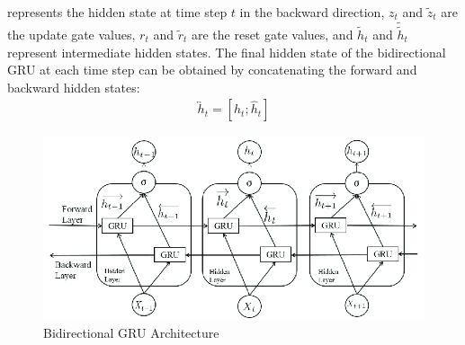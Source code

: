 \documentclass[a4paper, noexaminfo]{sapthesis}
\begin{document}
represents the hidden state at time step $t$ in the backward direction, 
$z_t$ and $\tilde{z}_t$ are the update gate values, $r_t$ and 
$\tilde{r}_t$ are the reset gate values, and $\tilde{h}_t$ 
and $\tilde{\tilde{h}}_t$ represent intermediate hidden states.\newline
The final hidden state of the bidirectional GRU at each time step can be 
obtained by concatenating the forward and backward hidden states:
\begin{align*}
\overleftrightarrow{h}_t = [h_t; \hat{h}_t]
\end{align*}
\begin{figure}
  \includegraphics[scale=1.1]{images/The-Bi-GRU-structure.png}
  \centering
  \caption{Bidirectional GRU Architecture}\label{fig:bidirectional_gru}
\end{figure}
\end{document}
